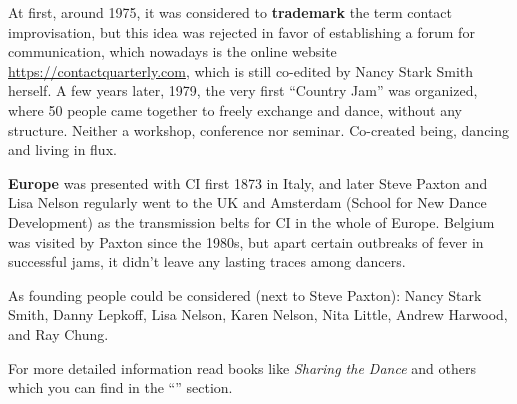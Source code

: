 At first, around 1975, it was considered to \textbf{trademark} the term contact improvisation, but this idea was rejected in favor of establishing a forum for communication, which nowadays is the online website \url{https://contactquarterly.com}, which is still co-edited by Nancy Stark Smith herself.
A few years later, 1979, the very first ``Country Jam'' was organized, where 50 people came together to freely exchange and dance, without any structure.
Neither a workshop, conference nor seminar.
Co-created being, dancing and living in flux.

\textbf{Europe} was presented with CI first 1873 in Italy, and later Steve Paxton and Lisa Nelson regularly went to the UK and Amsterdam (School for New Dance Development) as the transmission belts for CI in the whole of Europe.
Belgium was visited by Paxton since the 1980s, but apart certain outbreaks of fever in successful jams, it didn't leave any lasting traces among dancers.

As founding people could be considered (next to Steve Paxton): Nancy Stark Smith, Danny Lepkoff, Lisa Nelson, Karen Nelson, Nita Little, Andrew Harwood, and Ray Chung.

For more detailed information read books like \textit{Sharing the Dance} and others which you can find in the ``'' section.